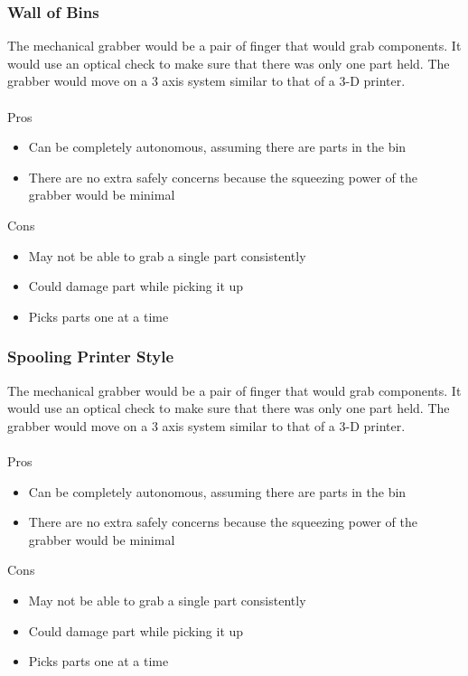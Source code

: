 \documentclass[12pt]{report}
\begin{document}
\subsubsection*{Wall of Bins}
The mechanical grabber would be a pair of finger that would grab components. It would use an optical check to make sure that there was only one part held. The grabber would move on a 3 axis system similar to that of a 3-D printer. \\ \\
Pros
\begin{itemize}
\item Can be completely autonomous, assuming there are parts in the bin
\item There are no extra safely concerns because the squeezing power of the grabber would be minimal
\end{itemize}
Cons
\begin{itemize}
\item May not be able to grab a single part consistently
\item Could damage part while picking it up
\item Picks parts one at a time
\end{itemize}

\subsubsection*{Spooling Printer Style}
The mechanical grabber would be a pair of finger that would grab components. It would use an optical check to make sure that there was only one part held. The grabber would move on a 3 axis system similar to that of a 3-D printer. \\ \\
Pros
\begin{itemize}
\item Can be completely autonomous, assuming there are parts in the bin
\item There are no extra safely concerns because the squeezing power of the grabber would be minimal
\end{itemize}
Cons
\begin{itemize}
\item May not be able to grab a single part consistently
\item Could damage part while picking it up
\item Picks parts one at a time
\end{itemize}
\end{document}
